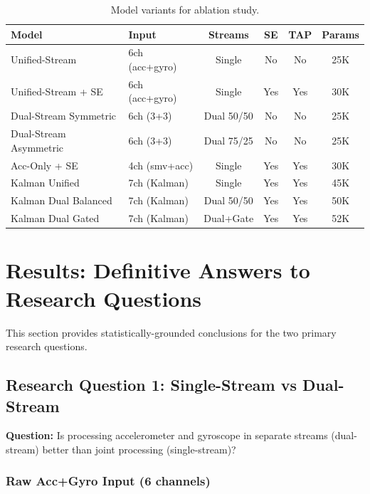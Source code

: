 \documentclass{article}
\begin{document}
\begin{table}[htbp]
    \centering
    \caption{Model variants for ablation study.}
    \label{tab:model_variants}
    \begin{tabular}{llcccc}
        \toprule
        \textbf{Model} & \textbf{Input} & \textbf{Streams} & \textbf{SE} & \textbf{TAP} & \textbf{Params} \\
        \midrule
        Unified-Stream & 6ch (acc+gyro) & Single & No & No & 25K \\
        Unified-Stream + SE & 6ch (acc+gyro) & Single & Yes & Yes & 30K \\
        Dual-Stream Symmetric & 6ch (3+3) & Dual 50/50 & No & No & 25K \\
        Dual-Stream Asymmetric & 6ch (3+3) & Dual 75/25 & No & No & 25K \\
        Acc-Only + SE & 4ch (smv+acc) & Single & Yes & Yes & 30K \\
        Kalman Unified & 7ch (Kalman) & Single & Yes & Yes & 45K \\
        Kalman Dual Balanced & 7ch (Kalman) & Dual 50/50 & Yes & Yes & 50K \\
        Kalman Dual Gated & 7ch (Kalman) & Dual+Gate & Yes & Yes & 52K \\
        \bottomrule
    \end{tabular}
\end{table}

\section{Results: Definitive Answers to Research Questions}
\label{sec:results_rq}

This section provides statistically-grounded conclusions for the two primary research questions.

\subsection{Research Question 1: Single-Stream vs Dual-Stream}

\textbf{Question:} Is processing accelerometer and gyroscope in separate streams (dual-stream) better than joint processing (single-stream)?

\subsubsection{Raw Acc+Gyro Input (6 channels)}
\end{document}

